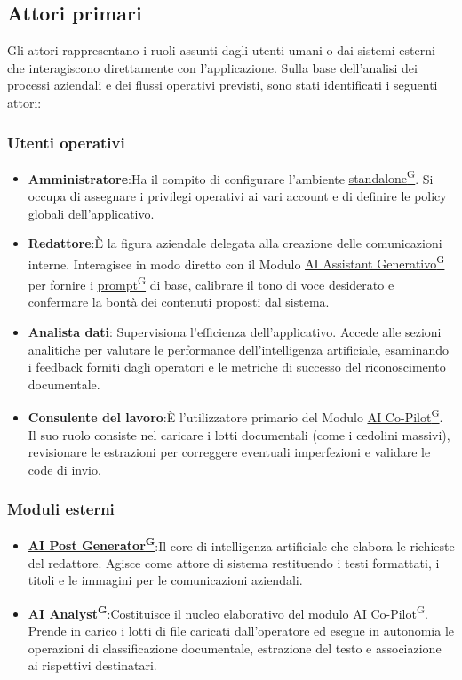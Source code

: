 ﻿\documentclass[a4paper,12pt]{article}
\providecommand{\glslink}[2]{\href{https://alittlebyte-19.github.io/Documentazione/glossario.html\#gls-#1}{\underline{#2}\textsuperscript{\scriptsize G}}}
\begin{document}
\subsection{Attori primari}
Gli attori rappresentano i ruoli assunti dagli utenti umani o dai sistemi esterni che interagiscono direttamente con l'applicazione. Sulla base dell'analisi dei processi aziendali e dei flussi operativi previsti, sono stati identificati i seguenti attori:
\subsubsection{Utenti operativi}
\begin{itemize}
    \item \textbf{Amministratore}:Ha il compito di configurare l'ambiente \glslink{standalone}{standalone}. Si occupa di assegnare i privilegi operativi ai vari account e di definire le policy globali dell'applicativo.
    \item \textbf{Redattore}:È la figura aziendale delegata alla creazione delle comunicazioni interne. Interagisce in modo diretto con il Modulo \glslink{ai-assistant-generativo}{AI Assistant Generativo} per fornire i \glslink{prompt}{prompt} di base, calibrare il tono di voce desiderato e confermare la bontà dei contenuti proposti dal sistema.
    \item \textbf{Analista dati}: Supervisiona l'efficienza dell'applicativo. Accede alle sezioni analitiche per valutare le performance dell'intelligenza artificiale, esaminando i feedback forniti dagli operatori e le metriche di successo del riconoscimento documentale.
    \item \textbf{Consulente del lavoro}:È l'utilizzatore primario del Modulo \glslink{ai-co-pilot-per-consulenti-del-lavoro-cdl}{AI Co-Pilot}. Il suo ruolo consiste nel caricare i lotti documentali (come i cedolini massivi), revisionare le estrazioni per correggere eventuali imperfezioni e validare le code di invio.
\end{itemize}
\subsubsection{Moduli esterni}
\begin{itemize}
    \item \textbf{\glslink{ai-post-generator}{AI Post Generator}}:Il core di intelligenza artificiale che elabora le richieste del redattore. Agisce come attore di sistema restituendo i testi formattati, i titoli e le immagini per le comunicazioni aziendali.
    \item \textbf{\glslink{ai-analyst}{AI Analyst}}:Costituisce il nucleo elaborativo del modulo \glslink{ai-co-pilot-per-consulenti-del-lavoro-cdl}{AI Co-Pilot}. Prende in carico i lotti di file caricati dall'operatore ed esegue in autonomia le operazioni di classificazione documentale, estrazione del testo e associazione ai rispettivi destinatari.
\end{itemize}
\end{document}
